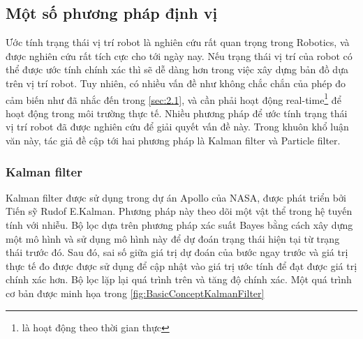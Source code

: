 



\subsection{Một số phương pháp định vị}

Ước tính trạng thái vị trí robot là nghiên cứu rất quan trọng trong Robotics, và được nghiên cứu rất tích cực cho tới ngày nay. Nếu trạng thái vị trí của robot có thể được ước tính chính xác thì sẽ dễ dàng hơn trong việc xây dựng bản đồ dựa trên vị trí robot. Tuy nhiên, có nhiều vấn đề như không chắc chắn của phép đo cảm biến như đã nhắc đến trong \ref{sec:2.1}, và cần phải hoạt động real-time\footnote{là hoạt động theo thời gian thực} để hoạt động trong môi trường thực tế. Nhiều phương pháp để ước tính trạng thái vị trí robot đã được nghiên cứu để giải quyết vấn đề này. Trong khuôn khổ luận văn này, tác giả đề cập tới hai phương pháp là Kalman filter và Particle filter.

\subsubsection*{Kalman filter}
Kalman filter được sử dụng trong dự án Apollo của NASA, được phát triển bởi Tiến sỹ Rudof E.Kalman. Phương pháp này theo dõi một vật thể trong hệ tuyến tính với nhiễu. Bộ lọc dựa trên phương pháp xác suất Bayes bằng cách xây dựng một mô hình và sử dụng mô hình này để dự đoán trạng thái hiện tại từ trạng thái trước đó. Sau đó, sai số giữa giá trị dự đoán của bước ngay trước và giá trị thực tế đo được được sử dụng để cập nhật vào giá trị ước tính để đạt được giá trị chính xác hơn. Bộ lọc lặp lại quá trình trên và tăng độ chính xác. Một quá trình cơ bản được minh họa trong \figurename{\ref{fig:BasicConceptKalmanFilter}}

